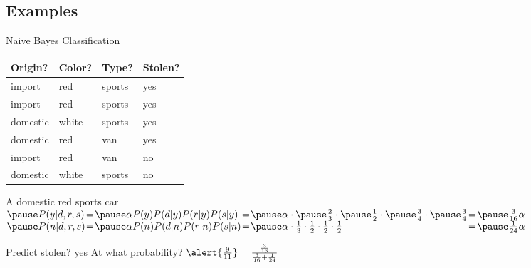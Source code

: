 \documentclass[14pt]{beamer}
\begin{document}
\subsection{Examples}
\begin{frame}{Naive Bayes Classification}
	\centering
	\begin{tabular}[t]{lll|l}
		Origin?  & Color? & Type?  & Stolen? \\
		\hline
		import   & red    & sports & yes \\
		import   & red    & sports & yes \\
		domestic & white  & sports & yes \\
		domestic & red    & van    & yes \\
		import   & red    & van    & no \\
		domestic & white  & sports & no \\
	\end{tabular}
	
	\pause
	\begin{block}{A domestic red sports car}
	\small
	$
	\begin{array}{@{}l@{\hspace{.1em}}l@{\hspace{.1em}}l@{\hspace{.1em}}l@{\hspace{.1em}}l@{\hspace{.1em}}l@{\hspace{.1em}}l@{}}
		\pause
		P(y|d,r,s) & = & \pause\alpha P(y)P(d|y)P(r|y)P(s|y) 
		           & = & \pause\alpha\cdot\pause\frac{2}{3}\cdot\pause\frac{1}{2}\cdot\pause\frac{3}{4}\cdot\pause\frac{3}{4}
		           & = & \pause\frac{3}{16}\alpha
		\\
		\pause
		P(n|d,r,s) & = & \pause\alpha P(n)P(d|n)P(r|n)P(s|n)
		           & = & \pause\alpha\cdot\frac{1}{3}\cdot\frac{1}{2}\cdot\frac{1}{2}\cdot\frac{1}{2}
		           & = & \pause\frac{1}{24}\alpha
	\end{array}
	$
	\normalsize
	\medskip
	
	\pause
	Predict stolen?
	\pause
	\alert{yes}
	\hfill
	\pause
	At what probability?
	\pause
	$\alert{\frac{9}{11}} = \frac{\frac{3}{16}}{\frac{3}{16} + \frac{1}{24}}$
	\end{block}
\end{frame}
\end{document}
